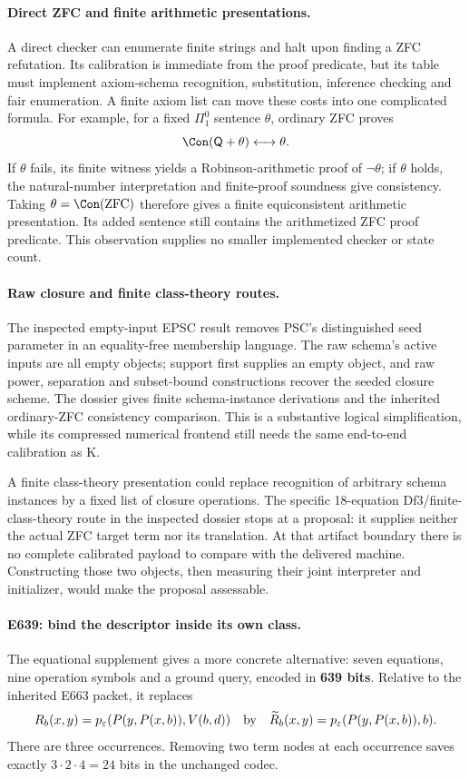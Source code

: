 \paragraph{Direct ZFC and finite arithmetic presentations.}
A direct checker can enumerate finite strings and halt upon finding a
ZFC refutation.  Its calibration is immediate from the proof predicate,
but its table must implement axiom-schema recognition, substitution,
inference checking and fair enumeration.  A finite axiom list can move
these costs into one complicated formula.  For example, for a fixed
$\Pi^0_1$ sentence $\theta$, ordinary ZFC proves
\[
 \Con(\mathsf Q+\theta)\longleftrightarrow\theta.
\]
If $\theta$ fails, its finite witness yields a Robinson-arithmetic proof
of $\neg\theta$; if $\theta$ holds, the natural-number interpretation
and finite-proof soundness give consistency.  Taking
$\theta=\Con(\mathrm{ZFC})$ therefore gives a finite equiconsistent
arithmetic presentation.  Its added sentence still contains the
arithmetized ZFC proof predicate.  This observation supplies no smaller
implemented checker or state count.

\paragraph{Raw closure and finite class-theory routes.}
The inspected empty-input EPSC result removes PSC's distinguished seed
parameter in an equality-free membership language.  The raw schema's
active inputs are all empty objects; support first supplies an empty
object, and raw power, separation and subset-bound constructions recover
the seeded closure scheme.  The dossier gives finite schema-instance
derivations and the inherited ordinary-ZFC consistency comparison.
This is a substantive logical simplification, while its compressed
numerical frontend still needs the same end-to-end calibration as K.

A finite class-theory presentation could replace recognition of arbitrary
schema instances by a fixed list of closure operations.  The specific
18-equation Df3/finite-class-theory route in the inspected dossier stops
at a proposal: it supplies neither the actual ZFC target term nor its
translation.  At that artifact boundary there is no complete calibrated
payload to compare with the delivered machine.  Constructing those two
objects, then measuring their joint interpreter and initializer, would
make the proposal assessable.

\paragraph{E639: bind the descriptor inside its own class.}
The equational supplement gives a more concrete alternative: seven
equations, nine operation symbols and a ground query, encoded in
\textbf{639 bits}.  Relative to the inherited E663 packet, it replaces
\[
 R_b(x,y)=p_\varepsilon(P(y,P(x,b)),V(b,d))
 \quad\hbox{by}\quad
 \widetilde R_b(x,y)=p_\varepsilon(P(y,P(x,b)),b).
\]
There are three occurrences.  Removing two term nodes at each occurrence
saves exactly $3\cdot2\cdot4=24$ bits in the unchanged codec.

